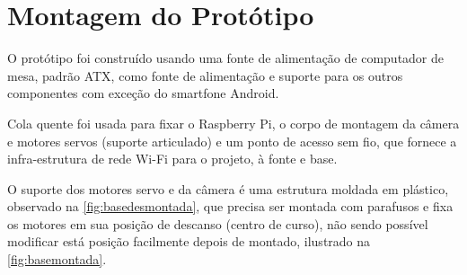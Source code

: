 \section{Montagem do Protótipo}
\label{sec:assemprototipo}

O protótipo foi construído usando uma fonte de alimentação de computador de mesa, padrão ATX, como fonte de alimentação e suporte para os outros componentes com exceção do smartfone Android.\par
Cola quente foi usada para fixar o Raspberry Pi, o corpo de montagem da câmera e motores servos (suporte articulado) e um ponto de acesso sem fio, que fornece a infra-estrutura de rede Wi-Fi para o projeto, à fonte e base. \par
O suporte dos motores servo e da câmera é uma estrutura moldada em plástico, observado na \autoref{fig:basedesmontada}, que precisa ser montada com parafusos e fixa os motores em sua posição de descanso (centro de curso), não sendo possível modificar está posição facilmente depois de montado, ilustrado na \autoref{fig:basemontada}.\par

